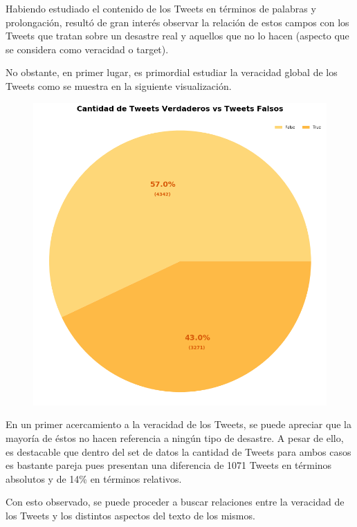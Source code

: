 \documentclass[titlepage,a4paper]{article}
\begin{document}
    Habiendo estudiado el contenido de los Tweets en términos de palabras y prolongación, resultó de gran interés observar la relación de estos campos con los Tweets que tratan sobre un desastre real y aquellos que no lo hacen (aspecto que se considera como veracidad o target).
    
    No obstante, en primer lugar, es primordial estudiar la veracidad global de los Tweets como se muestra en la siguiente visualización.
    
    \begin{figure}[H]
    \centering
    \includegraphics[width=1\textwidth]{graficos/Analisis Lexico Grafico/cantidad_de_tweets_verdadeos_vs_falsos.png}
    \end{figure}
    
    En un primer acercamiento a la veracidad de los Tweets, se puede apreciar que la mayoría de éstos no hacen referencia a ningún tipo de desastre. A pesar de ello, es destacable que dentro del set de datos la cantidad de Tweets para ambos casos es bastante pareja pues presentan una diferencia de 1071 Tweets en términos absolutos y de 14\% en términos relativos.
    
    Con esto observado, se puede proceder a buscar relaciones entre la veracidad de los Tweets y los distintos aspectos del texto de los mismos.
    
\end{document}
